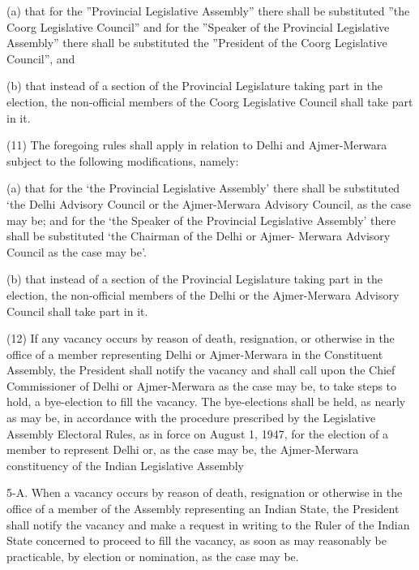 (a) that for the ''Provincial Legislative Assembly'' there shall be substituted ''the Coorg Legislative Council'' and for the ''Speaker of the Provincial Legislative Assembly'' there shall be substituted the ''President of the Coorg Legislative Council'', and

(b) that instead of a section of the Provincial Legislature taking part in the election, the non-official members of the Coorg Legislative Council shall take part in it.



(11) The foregoing rules shall apply in relation to Delhi and Ajmer-Merwara subject to the following modifications, namely:



(a) that for the \textquoteleft{}the Provincial Legislative Assembly\textquoteright{} there shall be substituted \textquoteleft{}the Delhi Advisory Council or the Ajmer-Merwara Advisory Council, as the case may be; and for the \textquoteleft{}the Speaker of the Provincial Legislative Assembly\textquoteright{} there shall be substituted \textquoteleft{}the Chairman of the Delhi or Ajmer- Merwara Advisory Council as the case may be\textquoteright{}.



(b) that instead of a section of the Provincial Legislature taking part in the election, the non-official members of the Delhi or the Ajmer-Merwara Advisory Council shall take part in it.



(12) If any vacancy occurs by reason of death, resignation, or otherwise in the office of a member representing Delhi or Ajmer-Merwara in the Constituent Assembly, the President shall notify the vacancy and shall call upon the Chief Commissioner of Delhi or Ajmer-Merwara as the case may be, to take steps to hold, a bye-election to fill the vacancy. The bye-elections shall be held, as nearly as may be, in accordance with the procedure prescribed by the Legislative Assembly Electoral Rules, as in force on August 1, 1947, for the election of a member to represent Delhi or, as the case may be, the Ajmer-Merwara constituency of the Indian Legislative Assembly



5-A. When a vacancy occurs by reason of death, resignation or otherwise in the office of a member of the Assembly representing an Indian State, the President shall notify the vacancy and make a request in writing to the Ruler of the Indian State concerned to proceed to fill the vacancy, as soon as may reasonably be practicable, by election or nomination, as the case may be. 



